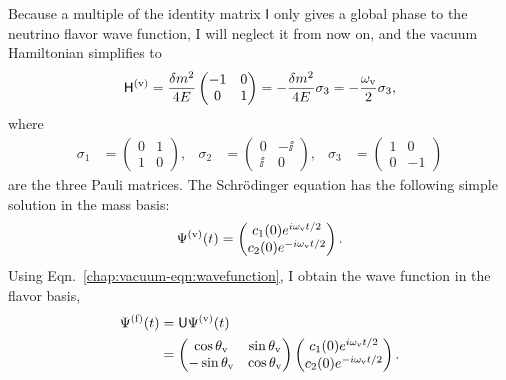 Because a multiple of the identity matrix $\mathsf{I}$ only gives a global phase to the neutrino flavor wave function, I will neglect it from now on, and the vacuum Hamiltonian simplifies to
\begin{equation}
\mathsf H^{(\mathrm v)} =  \frac{\delta m^2}{4E} \begin{pmatrix}
-1 & 0 \\
0 & 1
\end{pmatrix} = -\frac{\delta m^2}{4E} \sigma_3 = -\frac{\omega_{\mathrm v}}{2}\sigma_3,
\end{equation}
where
\begin{align}
\sigma_1 &=  \begin{pmatrix}
0 & 1 \\
1 & 0
\end{pmatrix}, &\sigma_2 &=  \begin{pmatrix}
0 & -\ii \\
\ii & 0
\end{pmatrix},  &\sigma_3 &=  \begin{pmatrix}
1 & 0 \\
0 & -1
\end{pmatrix}
\end{align}
are the three Pauli matrices.
The Schr\"{o}dinger equation has the following simple solution in the mass basis:
\begin{equation}
\Psi^{(\mathrm v)}(t) = \begin{pmatrix}
c_1(0) e^{i \omega_\mathrm v t/2 } \\
c_2(0) e^{ -i\omega_\mathrm v t/2 }
\end{pmatrix}.
\end{equation}
Using Eqn.~\ref{chap:vacuum-eqn:wavefunction}, I obtain the wave function in the flavor basis,
\begin{align}
\Psi^{(\ff)}(t) &= \mathsf{U}\Psi^{(\vv)}(t) \\
& = \begin{pmatrix} \cos\theta_\vv & \sin \theta_\vv \\ -\sin \theta_\vv & \cos \theta_\vv \end{pmatrix} \begin{pmatrix} c_1(0) e^{i\omega_\vv t/2 } \\
c_2(0) e^{ -i\omega_\vv t/2 }    \end{pmatrix} .
\label{chap:vacuum-eqn:wavefuncion-time}
\end{align}
